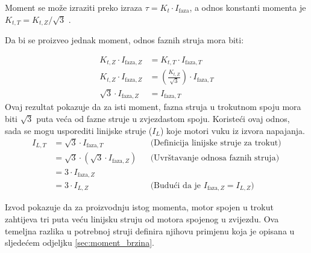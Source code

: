 \documentclass[diplomskirad]{fer}
\begin{document}
Moment se može izraziti preko izraza $\tau = K_t \cdot I_{\text{faza}}$, a
odnos konstanti momenta je $K_{t, T} = K_{t, Z} / \sqrt{3}$
\cite{cite:disertacija}.

Da bi se proizveo jednak moment, odnos faznih struja mora biti:

\begin{align*}
	K_{t,Z} \cdot I_{\text{faza},Z}  & = K_{t,T} \cdot I_{\text{faza},T}                                 \\
	K_{t,Z} \cdot I_{\text{faza},Z}  & = \left( \frac{K_{t,Z}}{\sqrt{3}} \right) \cdot I_{\text{faza},T} \\
	\sqrt{3} \cdot I_{\text{faza},Z} & = I_{\text{faza},T}
\end{align*}
Ovaj rezultat pokazuje da za isti moment, fazna struja u trokutnom spoju mora biti $\sqrt{3}$ puta veća od fazne struje u zvjezdastom spoju.
Koristeći ovaj odnos, sada se mogu usporediti linijske struje ($I_L$) koje motori vuku iz izvora napajanja.
\begin{align*}
	I_{L,T} & = \sqrt{3} \cdot I_{\text{faza},T}                  &  & \text{(Definicija linijske struje za trokut)}              \\
	        & = \sqrt{3} \cdot (\sqrt{3} \cdot I_{\text{faza},Z}) &  & \text{(Uvrštavanje odnosa faznih struja)}                  \\
	        & = 3 \cdot I_{\text{faza},Z}                                                                                         \\
	        & = 3 \cdot I_{L,Z}                                   &  & \text{(Budući da je } I_{\text{faza},Z} = I_{L,Z} \text{)}
\end{align*}

Izvod pokazuje da za proizvodnju istog momenta, motor spojen u trokut zahtijeva
tri puta veću linijsku struju od motora spojenog u zvijezdu. Ova temeljna
razlika u potrebnoj struji definira njihovu primjenu koja je opisana u
sljedećem odjeljku \ref{sec:moment_brzina}.
\end{document}
